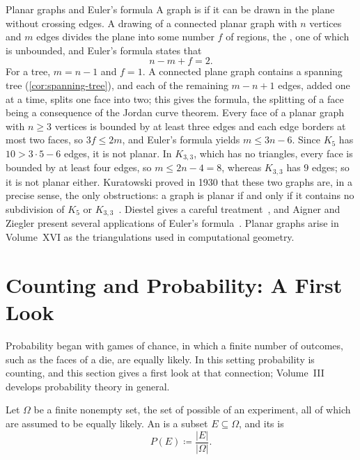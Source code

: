 \begin{note}{Planar graphs and Euler's formula}
A graph is  if it can be drawn in the plane without crossing edges. A drawing of a connected planar graph with $n$ vertices and $m$ edges divides the plane into some number $f$ of regions, the , one of which is unbounded, and Euler's formula states that
\[
n-m+f=2 .
\]
For a tree, $m=n-1$ and $f=1$. A connected plane graph contains a spanning tree (\cref{cor:spanning-tree}), and each of the remaining $m-n+1$ edges, added one at a time, splits one face into two; this gives the formula, the splitting of a face being a consequence of the Jordan curve theorem. Every face of a planar graph with $n\ge3$ vertices is bounded by at least three edges and each edge borders at most two faces, so $3f\le2m$, and Euler's formula yields $m\le3n-6$. Since $K_5$ has $10>3\cdot5-6$ edges, it is not planar. In $K_{3,3}$, which has no triangles, every face is bounded by at least four edges, so $m\le2n-4=8$, whereas $K_{3,3}$ has $9$ edges; so it is not planar either. Kuratowski proved in 1930 that these two graphs are, in a precise sense, the only obstructions: a graph is planar if and only if it contains no subdivision of $K_5$ or $K_{3,3}$~\cite{kuratowski1930}. Diestel gives a careful treatment~\cite[Chap.~4]{diestel2017}, and Aigner and Ziegler present several applications of Euler's formula~\cite{aigner2018proofs}. Planar graphs arise in Volume~XVI as the triangulations used in computational geometry.
\end{note}

\section{Counting and Probability: A First Look}
\label{sec:counting-probability}

Probability began with games of chance, in which a finite number of outcomes, such as the faces of a die, are equally likely. In this setting probability is counting, and this section gives a first look at that connection; Volume~III develops probability theory in general.

\begin{definition}
\label{def:classical-probability}
Let $\Omega$ be a finite nonempty set, the set of possible  of an experiment, all of which are assumed to be equally likely. An  is a subset $E\subseteq\Omega$, and its  is
\[
P(E)\coloneqq\frac{|E|}{|\Omega|}.
\]
\end{definition}

